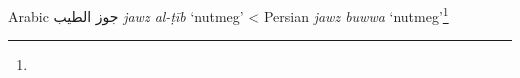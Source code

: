 \begin{etymology}\label{ety:jawz al-tib}
Arabic {جوز الطيب} \textit{jawz al-ṭīb} `nutmeg'
< Persian \textit{jawz buwwa} `nutmeg'\footnote{}
\end{etymology}